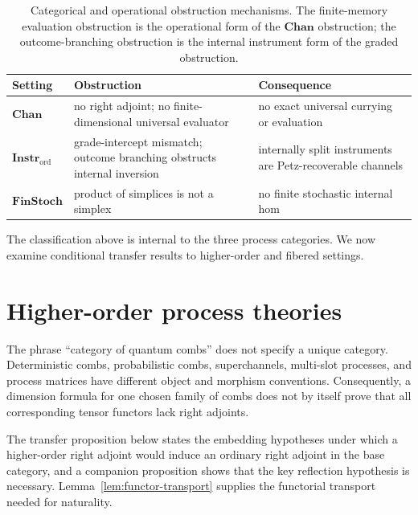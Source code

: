 \documentclass[11pt]{article}
\begin{document}
\begin{table}[htbp]
\centering
\begin{tabularx}{\textwidth}{lLL}
\toprule
Setting & Obstruction & Consequence \\
\midrule
$\mathbf{Chan}$
&
no right adjoint; no finite-dimensional universal evaluator
&
no exact universal currying or evaluation
\\[1mm]
$\mathbf{Instr}_{\mathrm{ord}}$
&
grade-intercept mismatch; outcome branching obstructs internal inversion
&
internally split instruments are Petz-recoverable channels
\\[1mm]
$\mathbf{FinStoch}$
&
product of simplices is not a simplex
&
no finite stochastic internal hom
\\
\bottomrule
\end{tabularx}
\caption{Categorical and operational obstruction mechanisms. The
finite-memory evaluation obstruction is the operational form of the
$\mathbf{Chan}$ obstruction; the outcome-branching obstruction is the
internal instrument form of the graded obstruction.}
\label{tab:operational-obstructions}
\end{table}

The classification above is internal to the three process categories. We now
examine conditional transfer results to higher-order and fibered settings.

\section{Higher-order process theories}
\label{sec:higher}

The phrase ``category of quantum combs'' does not specify a unique category.
Deterministic combs, probabilistic combs, superchannels, multi-slot
processes, and process matrices \cite{ChiribellaDArianoPerinotti2008,
ChiribellaDArianoPerinotti2009, OreshkovCostaBrukner2012} have different
object and morphism conventions. Consequently, a dimension formula for one
chosen family of combs does not by itself prove that all corresponding
tensor functors lack right adjoints.

The transfer proposition below states the embedding hypotheses under which a
higher-order right adjoint would induce an ordinary right adjoint in the
base category, and a companion proposition shows that the key reflection
hypothesis is necessary. Lemma~\ref{lem:functor-transport} supplies the
functorial transport needed for naturality.
\end{document}
